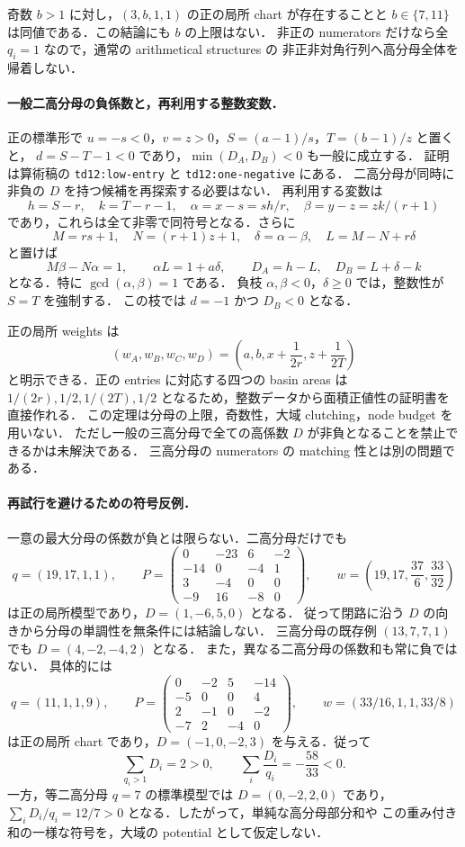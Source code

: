 奇数 $b>1$ に対し，$(3,b,1,1)$ の正の局所 chart が存在することと
$b\in\{7,11\}$ は同値である．この結論にも $b$ の上限はない．
非正の numerators だけなら全 $q_i=1$ なので，通常の arithmetical structures の
非正非対角行列\cite[\S\S1--3]{CorralesValencia}へ高分母全体を帰着しない．

\paragraph{一般二高分母の負係数と，再利用する整数変数．}
正の標準形で $u=-s<0$，$v=z>0$，$S=(a-1)/s$，$T=(b-1)/z$ と置くと，
$d=S-T-1<0$ であり，$\min(D_A,D_B)<0$ も一般に成立する．
証明は算術稿の \texttt{td12:low-entry} と \texttt{td12:one-negative} にある．
二高分母が同時に非負の $D$ を持つ候補を再探索する必要はない．
再利用する変数は
\[
 h=S-r,\quad k=T-r-1,\quad
 \alpha=x-s=sh/r,\quad \beta=y-z=zk/(r+1)
\]
であり，これらは全て非零で同符号となる．さらに
\[
 M=rs+1,\quad N=(r+1)z+1,\quad
 \delta=\alpha-\beta,\quad L=M-N+r\delta
\]
と置けば
\[
 M\beta-N\alpha=1,\qquad \alpha L=1+a\delta,
 \qquad D_A=h-L,\quad D_B=L+\delta-k
\]
となる．特に $\gcd(\alpha,\beta)=1$ である．
負枝 $\alpha,\beta<0$，$\delta\geq0$ では，整数性が $S=T$ を強制する．
この枝では $d=-1$ かつ $D_B<0$ となる．

正の局所 weights は
\[
 (w_A,w_B,w_C,w_D)
 =\left(a,b,x+\frac1{2r},z+\frac1{2T}\right)
\]
と明示できる．正の entries に対応する四つの basin areas は
$1/(2r),1/2,1/(2T),1/2$ となるため，整数データから面積正値性の証明書を直接作れる．
この定理は分母の上限，奇数性，大域 clutching，node budget を用いない．
ただし一般の三高分母で全ての高係数 $D$ が非負となることを禁止できるかは未解決である．
三高分母の numerators の matching 性とは別の問題である．

\paragraph{再試行を避けるための符号反例．}
一意の最大分母の係数が負とは限らない．二高分母だけでも
\[
 q=(19,17,1,1),\qquad
 P=\begin{pmatrix}
 0&-23&6&-2\\-14&0&-4&1\\3&-4&0&0\\-9&16&-8&0
 \end{pmatrix},\qquad
 w=\left(19,17,\frac{37}{6},\frac{33}{32}\right)
\]
は正の局所模型であり，$D=(1,-6,5,0)$ となる．
従って閉路に沿う $D$ の向きから分母の単調性を無条件には結論しない．
三高分母の既存例 $(13,7,7,1)$ でも $D=(4,-2,-4,2)$ となる．
また，異なる二高分母の係数和も常に負ではない．
具体的には
\[
 q=(11,1,1,9),\qquad
 P=\begin{pmatrix}
 0&-2&5&-14\\
 -5&0&0&4\\
 2&-1&0&-2\\
 -7&2&-4&0
 \end{pmatrix},\qquad
 w=(33/16,1,1,33/8)
\]
は正の局所 chart であり，$D=(-1,0,-2,3)$ を与える．従って
\[
 \sum_{q_i>1}D_i=2>0,\qquad
 \sum_i\frac{D_i}{q_i}=-\frac{58}{33}<0.
\]
一方，等二高分母 $q=7$ の標準模型では $D=(0,-2,2,0)$ であり，
$\sum_iD_i/q_i=12/7>0$ となる．したがって，単純な高分母部分和や
この重み付き和の一様な符号を，大域の potential として仮定しない．

